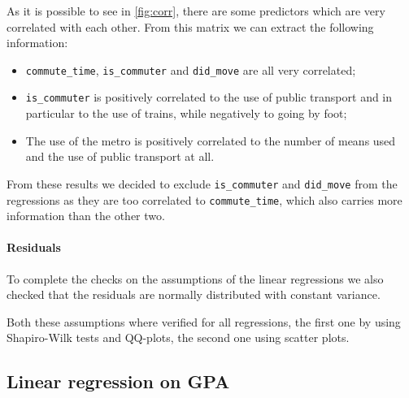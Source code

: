 \documentclass[11pt]{extarticle}
\numberwithin{table}{section}
\numberwithin{figure}{section}
\numberwithin{equation}{section}
\begin{document}
As it is possible to see in \cref{fig:corr}, there are some predictors which
are very correlated with each other.
From this matrix we can extract the following information:
\begin{itemize}
	\item \texttt{commute\_time}, \texttt{is\_commuter} and \texttt{did\_move}
	      are all very correlated;
	\item \texttt{is\_commuter} is positively correlated to the use of public transport
	      and in particular to the use of trains, while negatively to going by foot;
	\item The use of the metro is positively correlated to
	      the number of means used and the use of public transport at all.
\end{itemize}

From these results we decided to exclude \texttt{is\_commuter} and \texttt{did\_move}
from the regressions as they are too correlated to \texttt{commute\_time},
which also carries more information than the other two.

\paragraph{Residuals}
To complete the checks on the assumptions of the linear regressions
we also checked that the residuals are normally distributed with constant variance.

Both these assumptions where verified for all regressions,
the first one by using Shapiro-Wilk tests and QQ-plots, the second one using scatter plots.


\subsection{Linear regression on GPA}
\end{document}
